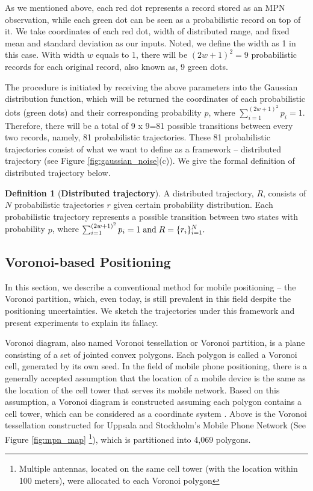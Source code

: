 \documentclass[12pt]{article}
\theoremstyle{definition}
\newtheorem{definition}{Definition}[section]
\begin{document}
As we mentioned above, each red dot represents a record stored as an MPN observation, while each green dot can be seen as a probabilistic record on top of it. We take coordinates of each red dot, width of distributed range, and fixed mean and standard deviation as our inputs. Noted, we define the width as 1 in this case. With width \(w\) equals to 1, there will be \((2w+1)^2=9\) probabilistic records for each original record, also known as, 9 green dots.

The procedure is initiated by receiving the above parameters into the Gaussian distribution function, which will be returned the coordinates of each probabilistic dots (green dots) and their corresponding probability \(p\), where \( \textstyle \sum_{i=1}^{(2w+1)^2} p_{i} = 1\). Therefore, there will be a total of 9 x 9=81 possible transitions between every two records, namely, 81 probabilistic trajectories. These 81 probabilistic trajectories consist of what we want to define as a framework -- distributed trajectory (see Figure \ref{fig:gaussian_noise}(c)). We give the formal definition of distributed trajectory below.

\begin{definition}[\textbf{Distributed trajectory}]
  \label{def:dist-traj}
  A distributed trajectory, \(R\), consists of \(N\) probabilistic trajectories \(r\) given certain probability distribution. Each probabilistic trajectory represents a possible transition between two states with probability \(p\), where \(\sum_{i=1}^{(2w+1)^2} p_{i} = 1 \;  \textnormal{and}\;  R=\{r_{i}\}_{i=1}^{N}.\)
\end{definition}


\subsection{Voronoi-based Positioning}
In this section, we describe a conventional method for mobile positioning – the Voronoi partition, which, even today, is still prevalent in this field despite the positioning uncertainties. We sketch the trajectories under this framework and present experiments to explain its fallacy.

Voronoi diagram, also named Voronoi tessellation or Voronoi partition, is a plane consisting of a set of jointed convex polygons. Each polygon is called a Voronoi cell, generated by its own seed. In the field of mobile phone positioning, there is a generally accepted assumption that the location of a mobile device is the same as the location of the cell tower that serves its mobile network. Based on this assumption, a Voronoi diagram is constructed assuming each polygon contains a cell tower, which can be considered as a coordinate system \cite{prob_posit_mpn_2021}. Above is the Voronoi tessellation constructed for Uppsala and Stockholm's Mobile Phone Network (See Figure \ref{fig:mpn_map} \footnote{Multiple antennas, located on the same cell tower (with the location within 100 meters), were allocated to each Voronoi polygon}), which is partitioned into 4,069 polygons.
\end{document}
